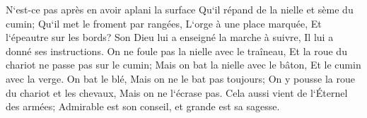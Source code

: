 \verse N`est-ce pas après en avoir aplani la surface Qu`il répand de la nielle et sème du cumin; Qu`il met le froment par rangées, L`orge à une place marquée, Et l`épeautre sur les bords? 
\verse Son Dieu lui a enseigné la marche à suivre, Il lui a donné ses instructions. 
\verse On ne foule pas la nielle avec le traîneau, Et la roue du chariot ne passe pas sur le cumin; Mais on bat la nielle avec le bâton, Et le cumin avec la verge. 
\verse On bat le blé, Mais on ne le bat pas toujours; On y pousse la roue du chariot et les chevaux, Mais on ne l`écrase pas. 
\verse Cela aussi vient de l`Éternel des armées; Admirable est son conseil, et grande est sa sagesse. 

